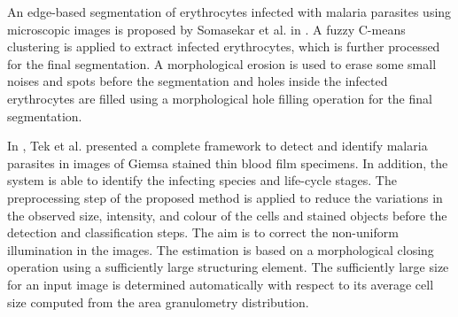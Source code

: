 \documentclass[sensors,review,accept,moreauthors,pdftex,10pt,a4paper]{mdpi}
\begin{document}
An edge-based segmentation of erythrocytes infected with malaria parasites using microscopic images is proposed by Somasekar et al. in \cite{Somasekar2015}.  A fuzzy C-means clustering is applied to extract infected erythrocytes, which is further processed for the final segmentation. A morphological erosion is used to erase some small noises and spots before the segmentation and holes inside the infected erythrocytes are filled using a morphological hole filling operation for the final segmentation.

In \cite{Tek2010}, Tek et al. presented a complete framework to detect and identify malaria parasites in images of Giemsa stained thin blood film specimens. In addition, the system is able to identify the infecting species and life-cycle stages.
The preprocessing step of the proposed method is applied to reduce the variations in the observed size, intensity, and colour of the cells and stained objects before the detection and classification steps. The aim is to correct the non-uniform illumination in the images. The estimation is based on a morphological closing operation using a sufficiently large structuring element. The sufficiently large size for an input image is determined automatically with respect to its average cell size computed from the area granulometry distribution.

\end{document}
